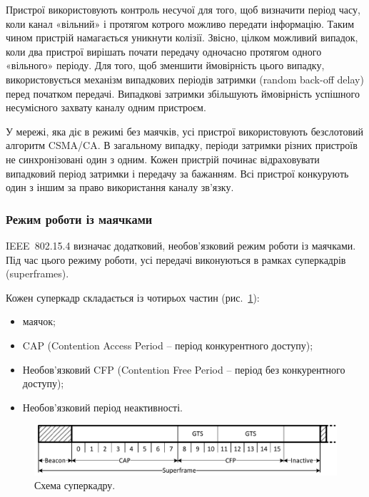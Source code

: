 \documentclass[a4paper,ukrainian,utf8,nocolumnsxix,floatsection,equationsection]{eskdtext}
\renewcommand\paragraph{\subsubsection}
\newcommand{\figref}[1]{рис.~\ref{#1}}
\newcommand{\iee}[0]{IEEE~802.15.4\xspace}
\newcommand{\csma}[0]{CSMA/CA\xspace}
\begin{document}
\afterpage{\clearpage}

Пристрої використовують контроль несучої для того, щоб визначити період часу, коли канал «вільний» і протягом котрого можливо передати інформацію. Таким чином пристрій намагається уникнути колізії. Звісно, цілком можливий випадок, коли два пристрої вирішать почати передачу  одночасно протягом одного  «вільного» періоду. Для того, щоб зменшити ймовірність цього випадку, використовується механізм випадкових періодів затримки (random back-off delay) перед початком передачі. Випадкові затримки збільшують ймовірність успішного несумісного захвату каналу одним пристроєм.

У мережі, яка діє в режимі без маячків, усі пристрої використовують безслотовий алгоритм \csma. В загальному випадку, періоди затримки різних пристроїв не синхронізовані один з одним.  Кожен пристрій починає відраховувати випадковий період затримки і передачу за бажанням. Всі пристрої конкурують один з іншим за право використання каналу зв’язку. 


\paragraph{Режим роботи із маячками}
\label{par:beacon:enabled:mode}

\iee визначає додатковий, необов’язковий режим роботи із маячками. Під час цього режиму роботи, усі передачі виконуються в рамках суперкадрів (superframes). 

Кожен суперкадр складається із чотирьох частин (\figref{fig:superframe}):

\begin{itemize}
	\item маячок;
	\item CAP (Contention Access Period – період конкурентного доступу);
	\item Необов’язковий CFP (Contention Free Period – період без конкурентного доступу);
	\item Необов’язковий період неактивності.
\end{itemize}

\begin{figure}[bth]
	\centering
	\includegraphics[width=\textwidth]{img/superframe.pdf}
	\caption{\label{fig:superframe}Схема суперкадру.}
\end{figure}
\end{document}
